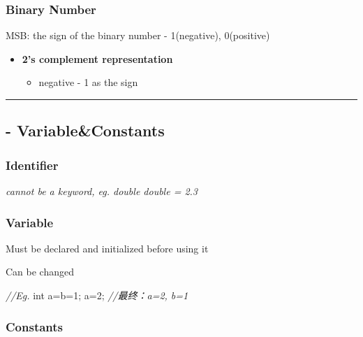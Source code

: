 \documentclass[
  paper=a4,
  ,captions=tableheading
]{scrartcl}
\newenvironment{Shaded}{}{}
\newcommand{\CommentTok}[1]{\textcolor[rgb]{0.38,0.63,0.69}{\textit{#1}}}
\newcommand{\DataTypeTok}[1]{\textcolor[rgb]{0.56,0.13,0.00}{#1}}
\newcommand{\DecValTok}[1]{\textcolor[rgb]{0.25,0.63,0.44}{#1}}
\newcommand{\NormalTok}[1]{#1}
\begin{document}
\hypertarget{binary-number}{%
\subsubsection{Binary Number}\label{binary-number}}

MSB: the sign of the binary number - 1(negative), 0(positive)

\begin{itemize}
\item
  \textbf{2's complement representation}

  \begin{itemize}
  \item
    negative - 1 as the sign
  \end{itemize}
\end{itemize}

\begin{center}\rule{0.5\linewidth}{\linethickness}\end{center}

\hypertarget{variableconstants}{%
\subsection{- Variable\&Constants}\label{variableconstants}}

\hypertarget{identifier}{%
\subsubsection{Identifier}\label{identifier}}

\emph{cannot be a keyword, eg. double double = 2.3}

\hypertarget{variable}{%
\subsubsection{Variable}\label{variable}}

Must be declared and initialized before using it

Can be changed

\begin{Shaded}
\begin{Highlighting}[]
\CommentTok{//Eg.}
\DataTypeTok{int}\NormalTok{ a=b=}\DecValTok{1}\NormalTok{;}
\NormalTok{a=}\DecValTok{2}\NormalTok{;}
\CommentTok{//最终：a=2, b=1 }
\end{Highlighting}
\end{Shaded}

\hypertarget{constants}{%
\subsubsection{Constants}\label{constants}}
\end{document}
